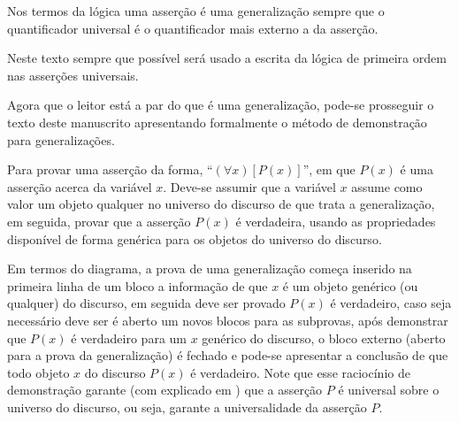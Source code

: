 Nos termos da lógica uma asserção é uma generalização sempre que o quantificador universal é o quantificador mais externo a da asserção.

\begin{remark}
	Neste texto sempre que possível será usado a escrita da lógica de primeira ordem nas asserções universais. 
\end{remark}

Agora que o leitor está a par do que é uma generalização, pode-se prosseguir o texto deste manuscrito apresentando formalmente o método de demonstração para generalizações.

\begin{definition}
	Para provar uma asserção da forma, ``$(\forall x)[P(x)]$'', em que $P(x)$ é uma asserção acerca da variável $x$. Deve-se assumir que a variável $x$ assume como valor um objeto qualquer no universo do discurso de que trata a  generalização, em seguida, provar que a asserção $P(x)$ é verdadeira, usando as propriedades disponível de forma genérica para os objetos do universo do discurso.
\end{definition}

Em termos do diagrama, a prova de uma generalização começa inserido na primeira linha de um bloco a informação de que $x$ é um objeto genérico (ou qualquer) do discurso, em seguida deve ser provado $P(x)$ é verdadeiro, caso seja necessário deve ser é aberto um novos blocos para as subprovas, após demonstrar que $P(x)$ é verdadeiro para um $x$ genérico do discurso, o bloco externo (aberto para a prova da generalização) é fechado e  pode-se apresentar a conclusão de que todo objeto $x$ do discurso $P(x)$ é verdadeiro. Note que esse raciocínio de demonstração garante (com explicado em \cite{velleman2019comProvar}) que a asserção $P$ é universal sobre o universo do discurso, ou seja, garante a universalidade da asserção $P$.

